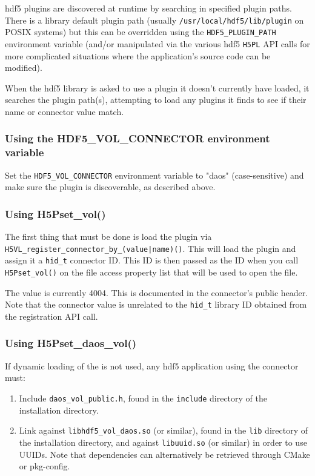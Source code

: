 \documentclass[../users_guide.tex]{subfiles}
\begin{document}
\acrshort{hdf5} plugins are discovered at runtime by searching in specified
plugin paths. There is a library default plugin path (usually
\texttt{/usr/local/hdf5/lib/plugin} on POSIX systems) but this can be
overridden using the \texttt{HDF5\_PLUGIN\_PATH} environment variable (and/or
manipulated via the various \acrshort{hdf5} \texttt{H5PL} API calls for more
complicated situations where the application's source code can be modified).

When the \acrshort{hdf5} library is asked to use a plugin it doesn't
currently have loaded, it searches the plugin path(s), attempting to load
any plugins it finds to see if their name or connector value match.

\subsubsection{Using the HDF5\_VOL\_CONNECTOR environment variable}

Set the \texttt{HDF5\_VOL\_CONNECTOR} environment variable to "daos"
(case-sensitive) and make sure the \dvc{} plugin is discoverable, as
described above.

\subsubsection{Using H5Pset\_vol()}

The first thing that must be done is load the \dvc{} plugin via \newline
\texttt{H5VL\_register\_connector\_by\_(value|name)()}. This will load the
plugin and assign it a \texttt{hid\_t} connector ID. This ID is then passed
as the \vc{} ID when you call \texttt{H5Pset\_vol()} on the file access
property list that will be used to open the file.

The \dvc{} value is currently 4004. This is documented in the connector's
public header. Note that the connector value is unrelated to the
\texttt{hid\_t} library ID obtained from the registration API call.

\subsubsection{Using H5Pset\_daos\_vol()}

If dynamic loading of the \dvc{} is not used, any \acrshort{hdf5} application
using the connector must:
\begin{enumerate}
 \item Include \texttt{daos\_vol\_public.h}, found in the \texttt{include}
directory of the \dvc{} installation directory.
 \item Link against \texttt{libhdf5\_vol\_daos.so} (or similar), found in
the \texttt{lib} directory of the \dvc{} installation directory, and
against \texttt{libuuid.so} (or similar) in order to use UUIDs. Note that dependencies
can alternatively be retrieved through CMake or pkg-config.
\end{enumerate}
\end{document}
